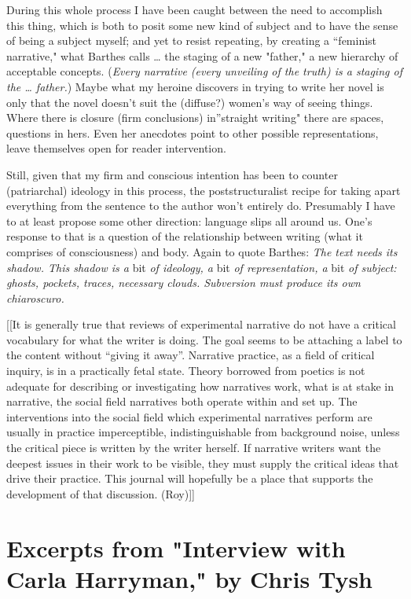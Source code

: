 \documentclass[
]{memoir}
\begin{document}
During this whole process I have been caught between the need to
accomplish this thing, which is both to posit some new kind of subject
and to have the sense of being a subject myself; and yet to resist
repeating, by creating a ``feminist narrative," what Barthes calls
\ldots{} the staging of a new "father," a new hierarchy of acceptable
concepts. (\emph{Every narrative (every unveiling of the truth) is a
staging of the \ldots{} father.}) Maybe what my heroine discovers in
trying to write her novel is only that the novel doesn't suit the
(diffuse?) women's way of seeing things. Where there is closure (firm
conclusions) in''straight writing" there are spaces, questions in hers.
Even her anecdotes point to other possible representations, leave
themselves open for reader intervention.

Still, given that my firm and conscious intention has been to counter
(patriarchal) ideology in this process, the poststructuralist recipe for
taking apart everything from the sentence to the author won't entirely
do. Presumably I have to at least propose some other direction: language
slips all around us. One's response to that is a question of the
relationship between writing (what it comprises of consciousness) and
body. Again to quote Barthes: \emph{The text needs its shadow. This
shadow is a} bit \emph{of ideology, a} bit \emph{of representation, a}
bit \emph{of subject: ghosts, pockets, traces, necessary clouds.
Subversion must produce its own chiaroscuro.}

{[}{[}It is generally true that reviews of experimental narrative do not
have a critical vocabulary for what the writer is doing. The goal seems
to be attaching a label to the content without ``giving it away''.
Narrative practice, as a field of critical inquiry, is in a practically
fetal state. Theory borrowed from poetics is not adequate for describing
or investigating how narratives work, what is at stake in narrative, the
social field narratives both operate within and set up. The
interventions into the social field which experimental narratives
perform are usually in practice imperceptible, indistinguishable from
background noise, unless the critical piece is written by the writer
herself. If narrative writers want the deepest issues in their work to
be visible, they must supply the critical ideas that drive their
practice. This journal will hopefully be a place that supports the
development of that discussion. (Roy){]}{]}

\hypertarget{excerpts-from-interview-with-carla-harryman-by-chris-tysh}{%
\section*{Excerpts from "Interview with Carla Harryman," by Chris
Tysh}\label{excerpts-from-interview-with-carla-harryman-by-chris-tysh}}
\end{document}
